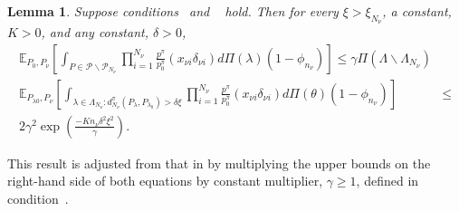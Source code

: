 \documentclass[]{imsart}
\newtheorem{lemma}[theorem]{Lemma}
\begin{document}
\begin{lemma}\label{numerator}
Suppose conditions~ and ~ hold.  Then for every $\xi > \xi_{N_{\nu}}$, a constant, $K>0$, and any constant, $\delta > 0$,
\begin{align}
\mathbb{E}_{P_{0},P_{\nu}}\left[\mathop{\int}_{P\in\mathcal{P}\backslash\mathcal{P}_{N_{\nu}}}\mathop{\prod}_{i=1}^{N_{\nu}}
\frac{p^{\pi}}{p_{0}^{\pi}}\left(x_{\nu i}\delta_{\nu i}\right)d\Pi\left(\lambda\right)\left(1-\phi_{n_{\nu}}\right)\right] \leq \gamma\Pi\left(\Lambda\backslash\Lambda_{N_{\nu}}\right)& \label{outside}\\
\mathbb{E}_{P_{\lambda{0}},P_{\nu}}
\left[\mathop{\int}_{\lambda\in\Lambda_{N_{\nu}}:d^{\pi}_{N_{\nu}}\left(P_{\lambda},P_{\lambda_{0}}\right)> \delta\xi}\mathop{\prod}_{i=1}^{N_{\nu}}
\frac{p^{\pi}}{p_{0}^{\pi}}\left(x_{\nu i}\delta_{\nu i}\right)d\Pi\left(\theta\right)\left(1-\phi_{n_{\nu}}\right)\right] &\leq \nonumber \\
2\gamma^{2}\exp\left(\frac{-K n_{\nu}\delta^{2}\xi^{2}}{\gamma}\right).&\label{inside}
\end{align}
\end{lemma}

This result is adjusted from that in \citet{savitsky2016bayesian} by multiplying the upper bounds on the right-hand side of both equations by constant multiplier, $\gamma \geq 1$, defined in condition~.
\end{document}
